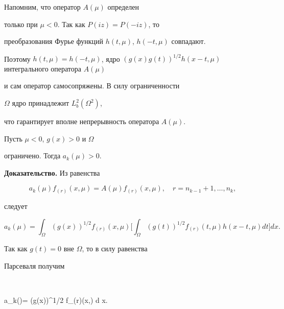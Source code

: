 \begin{pf}


Напомним, что оператор $A(\mu)$ определен


только при $\mu <0$. Так как $P(iz) = P(-iz)$, то


преобразования Фурье функций $h(t,\mu)$, $h(-t,\mu)$ совпадают.


Поэтому $h(t,\mu)=h(-t,\mu)$, ядро $(g(x)


g(t))^{1/2} h(x-t,\mu)$ интегрального оператора $A(\mu)$


и сам оператор самосопряжены. В силу ограниченности


$\Omega$ ядро принадлежит $L^{2}_{b}(\Omega ^{2})$,


что гарантирует вполне непрерывность оператора $A(\mu)$.


\end{pf}





\begin{lem}


Пусть $\mu <0$, $g(x) >0$ и $\Omega$


ограничено. Тогда $a_{k}(\mu) >0$.


\end{lem}





{\bf Доказательство.} Из равенства


$$


a_{k}(\mu) f_{(r)}(x,\mu)= A(\mu) f_{(r)}(x,\mu),\quad


r=n_{k-1}+1,\dotsc,n_{k},


$$


следует


$$


a_{k}(\mu)= \int_{\Omega} (g(x))^{1/2} f_{(r)}(x,\mu)


\bigg[ \int_{\Omega} (g(t))^{1/2} f_{(r)}(t,\mu ) h(x-t,\mu)


dt \bigg] dx.


$$


Так как $g(t)=0 $ вне $\Omega $, то в силу равенства


Парсеваля получим


$$


a_{k}(\mu)= \int (g(x))^{1/2} f_{(r)}(x,\mu)  d x.


